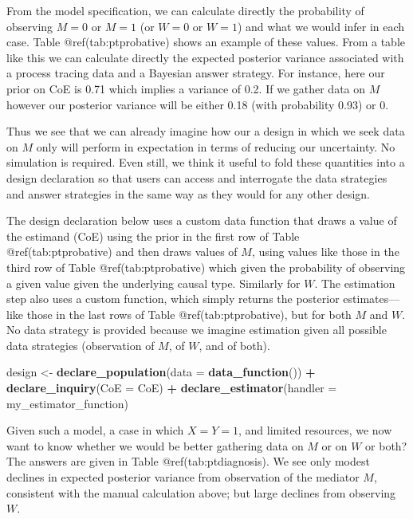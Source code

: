 \documentclass[
]{article}
\newenvironment{Shaded}{\begin{snugshade}}{\end{snugshade}}
\newcommand{\DataTypeTok}[1]{\textcolor[rgb]{0.13,0.29,0.53}{#1}}
\newcommand{\KeywordTok}[1]{\textcolor[rgb]{0.13,0.29,0.53}{\textbf{#1}}}
\newcommand{\NormalTok}[1]{#1}
\newcommand{\OperatorTok}[1]{\textcolor[rgb]{0.81,0.36,0.00}{\textbf{#1}}}
\newcommand{\StringTok}[1]{\textcolor[rgb]{0.31,0.60,0.02}{#1}}
\begin{document}
From the model specification, we can calculate directly the probability
of observing \(M=0\) or \(M=1\) (or \(W=0\) or \(W=1\)) and what we
would infer in each case. Table @ref(tab:ptprobative) shows an example
of these values. From a table like this we can calculate directly the
expected posterior variance associated with a process tracing data and a
Bayesian answer strategy. For instance, here our prior on CoE is 0.71
which implies a variance of 0.2. If we gather data on \(M\) however our
posterior variance will be either 0.18 (with probability 0.93) or 0.

Thus we see that we can already imagine how our a design in which we
seek data on \(M\) only will perform in expectation in terms of reducing
our uncertainty. No simulation is required. Even still, we think it
useful to fold these quantities into a design declaration so that users
can access and interrogate the data strategies and answer strategies in
the same way as they would for any other design.

The design declaration below uses a custom data function that draws a
value of the estimand (CoE) using the prior in the first row of Table
@ref(tab:ptprobative) and then draws values of \(M\), using values like
those in the third row of Table @ref(tab:ptprobative) which given the
probability of observing a given value given the underlying causal type.
Similarly for \(W\). The estimation step also uses a custom function,
which simply returns the posterior estimates---like those in the last
rows of Table @ref(tab:ptprobative), but for both \(M\) and \(W\). No
data strategy is provided because we imagine estimation given all
possible data strategies (observation of \(M\), of \(W\), and of both).

\begin{Shaded}
\begin{Highlighting}[]
\NormalTok{design <-}\StringTok{ }
\StringTok{  }\KeywordTok{declare_population}\NormalTok{(}\DataTypeTok{data =} \KeywordTok{data_function}\NormalTok{()) }\OperatorTok{+}\StringTok{ }
\StringTok{  }\KeywordTok{declare_inquiry}\NormalTok{(}\DataTypeTok{CoE =}\NormalTok{ CoE) }\OperatorTok{+}
\StringTok{  }\KeywordTok{declare_estimator}\NormalTok{(}\DataTypeTok{handler =}\NormalTok{ my_estimator_function)}
\end{Highlighting}
\end{Shaded}

Given such a model, a case in which \(X=Y=1\), and limited resources, we
now want to know whether we would be better gathering data on \(M\) or
on \(W\) or both? The answers are given in Table @ref(tab:ptdiagnosis).
We see only modest declines in expected posterior variance from
observation of the mediator \(M\), consistent with the manual
calculation above; but large declines from observing \(W\).
\end{document}

